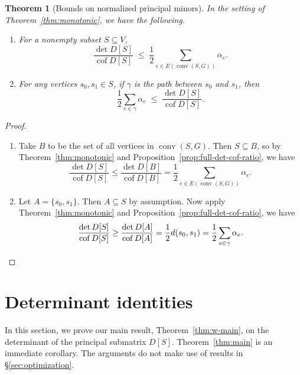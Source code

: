 \documentclass[12pt]{amsart}
\newtheorem{thm}{Theorem}[section]
\theoremstyle{definition}
\newcommand{\Da}{{D}}
\DeclareMathOperator{\cof}{cof}
\DeclareMathOperator{\conv}{conv}
\begin{document}
\begin{thm}[Bounds on normalized principal minors]
\label{thm:det-cof-bounds}
	In the setting of Theorem~\ref{thm:monotonic}, we have the following.
	\begin{enumerate}[label=(\alph*)]
	\item
	For a nonempty subset $S \subseteq V$,
	\begin{equation*}
		\frac{\det \Da[S]}{\cof \Da[S]} \;\leq\; \frac12 \sum_{e \in E(\conv(S, G))} \alpha_e .
	\end{equation*}
	\item 
	For any vertices $s_0, s_1 \in S$,
	if $\gamma$ is the path between $s_0$ and $s_1$, then
	\begin{equation*}
		\frac12 \sum_{e \in \gamma} \alpha_e \;\leq\; \frac{\det \Da[S]}{\cof \Da[S]}.
	\end{equation*}
	\end{enumerate}
\end{thm}

\begin{proof}
\begin{enumerate}[label=(\alph*)]
\item Take $B$ to be the set of all vertices in $\conv(S, G)$.
Then $S \subseteq B$, so by Theorem~\ref{thm:monotonic}
and Proposition~\ref{prop:full-det-cof-ratio}, we have
\[
	\frac{\det D[S]}{\cof D[S]} \leq \frac{\det D[B]}{\cof D[B]} = \frac12 \sum_{e \in E(\conv(S, G))} \alpha_e .
\]
\item 
Let $A=\{s_0, s_1\}$.
Then $A \subseteq S$ by assumption. Now apply Theorem~\ref{thm:monotonic}
and Proposition~\ref{prop:full-det-cof-ratio}, we have
\[\frac{\det D[S]}{\cof D[S]}\geq
	\frac{\det D[A]}{\cof D[A]}
	= \frac12 d(s_0, s_1) 
	= \frac12 \sum_{e \in \gamma} \alpha_e .
	\qedhere
\]
\end{enumerate}
\end{proof}


\section{Determinant identities}
\label{sec:distance_proofs}

In this section, we prove our main result, Theorem~\ref{thm:w-main}, on the determinant of the principal submatrix $D[S]$.
Theorem~\ref{thm:main} is an immediate corollary.
The arguments do not make use of results in \S\ref{sec:optimization}.
\end{document}
